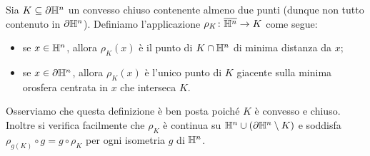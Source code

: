 \begin{comment}
\begin{proposition*}
Supponiamo che $\Gamma$ agisca su $\HH^n$ in modo libero e propriamente discontinuo. Allora $\Gamma$ agisce liberamente anche su $O(\Gamma)$.
\end{proposition*}
\begin{proof}
È sufficiente mostrare che tutti i punti fissi di elementi di $\Gamma$ giacciono in $L(\Gamma)$. Sia $g\in\Gamma$; distinguiamo due casi.
\begin{itemize}
\item Se $g$ è iperbolico, considerando il modello del semispazio $H^n$ si vede immediatamente che i due punti fissi di $g$ sono anche punti limite di $\langle g\rangle$.
\item Se $g$ è parabolico, consideriamo una qualunque orbita $\langle g\rangle \cdot x$. Poiché $\overline{\HH^n}$ è metrizzabile e compatto, necessariamente questa orbita ammette un punto limite, il quale risulta fissato da $g$; ma $g$ ha un unico punto fisso, che dunque è anche un punto limite.\qedhere
\end{itemize}
\end{proof}
\end{comment}

\begin{definition*}
Sia $K\subseteq\partial\mathbb{H}^n$ un convesso chiuso contenente almeno due punti (dunque non tutto contenuto in $\partial\mathbb{H}^n$). Definiamo l'applicazione $\rho_K\colon\overline{\mathbb{H}^n}\to K$ come segue:
\begin{itemize}
\item se $x\in\mathbb{H}^n$, allora $\rho_K(x)$ è il punto di $K\cap\mathbb{H}^n$ di minima distanza da $x$;
\item se $x\in\partial\mathbb{H}^n$, allora $\rho_K(x)$ è l'unico punto di $K$ giacente sulla minima orosfera centrata in $x$ che interseca $K$.
\end{itemize}
\end{definition*}
Osserviamo che questa definizione è ben posta poiché $K$ è convesso e chiuso. Inoltre si verifica facilmente che $\rho_K$ è continua su $\mathbb{H}^n\cup(\partial\mathbb{H}^n\setminus K)$ e soddisfa $\rho_{g(K)}\circ g=g\circ\rho_K$ per ogni isometria $g$ di $\mathbb{H}^n$.

